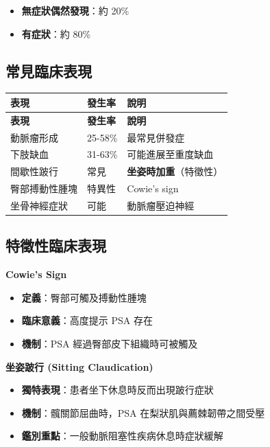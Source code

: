 \documentclass[12pt,a4paper]{article}
\begin{document}
\begin{itemize}
    \item \textbf{無症狀偶然發現}：約 20\%
    \item \textbf{有症狀}：約 80\%
\end{itemize}

\subsection{常見臨床表現}

\begin{longtable}{p{4cm}p{3cm}p{7cm}}
\toprule
\textbf{表現} & \textbf{發生率} & \textbf{說明} \\
\midrule
\endfirsthead
\toprule
\textbf{表現} & \textbf{發生率} & \textbf{說明} \\
\midrule
\endhead
\bottomrule
\endlastfoot
動脈瘤形成 & 25-58\% & 最常見併發症 \\
\midrule
下肢缺血 & 31-63\% & 可能進展至重度缺血 \\
\midrule
間歇性跛行 & 常見 & \textbf{坐姿時加重}（特徵性） \\
\midrule
臀部搏動性腫塊 & 特異性 & Cowie's sign \\
\midrule
坐骨神經症狀 & 可能 & 動脈瘤壓迫神經 \\
\end{longtable}

\subsection{特徵性臨床表現}

\begin{importantbox}
\textbf{Cowie's Sign}
\begin{itemize}
    \item \textbf{定義}：臀部可觸及搏動性腫塊
    \item \textbf{臨床意義}：高度提示 PSA 存在
    \item \textbf{機制}：PSA 經過臀部皮下組織時可被觸及
\end{itemize}

\vspace{0.3cm}

\textbf{坐姿跛行 (Sitting Claudication)}
\begin{itemize}
    \item \textbf{獨特表現}：患者坐下休息時反而出現跛行症狀
    \item \textbf{機制}：髖關節屈曲時，PSA 在梨狀肌與薦棘韌帶之間受壓
    \item \textbf{鑑別重點}：一般動脈阻塞性疾病休息時症狀緩解
\end{itemize}
\end{importantbox}
\end{document}
